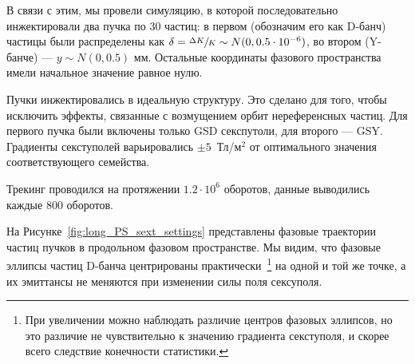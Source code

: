 В связи с этим, мы провели симуляцию, в которой последовательно инжектировали два пучка по 30 частиц: 
в первом (обозначим его как D-банч) частицы были распределены как 
${\delta=\sfrac{\Delta K}{K}\sim N(0, 0.5\cdot 10^{-6})}$, во втором (Y-банче) --- ${y\sim N(0, 0.5)}$ мм. 
Остальные координаты фазового пространства имели начальное значение равное нулю. 

Пучки инжектировались в идеальную структуру. Это сделано для того, чтобы исключить эффекты, 
связанные с возмущением орбит нереференсных частиц. Для первого пучка были включены 
только GSD секспутоли, для второго --- GSY. Градиенты секступолей варьировались 
{$\pm 5$~Тл/м$^2$} от оптимального значения соответствующего семейства.

Трекинг проводился на протяжении $1.2\cdot 10^6$ оборотов, данные выводились каждые 800 оборотов.

На Рисунке~\ref{fig:long_PS_sext_settings} представлены фазовые траектории частиц пучков 
в продольном фазовом пространстве. Мы видим, что фазовые эллипсы частиц D-банча 
центрированы практически~\footnote{При увеличении можно наблюдать различие центров фазовых эллипсов, 
	но это различие не чувствительно к значению градиента секступоля, 
	и скорее всего следствие конечности статистики.} на одной и той же точке, а их эмиттансы 
не меняются при изменении силы поля сексуполя. 

